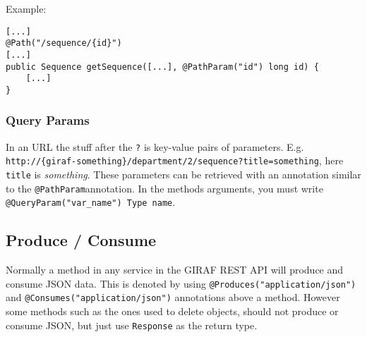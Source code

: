 \bigskip\noindent
Example:
\begin{lstlisting}[style=Java]
[...]
@Path("/sequence/{id}")
[...]
public Sequence getSequence([...], @PathParam("id") long id) {
    [...]
}
\end{lstlisting}

\subsubsection{Query Params}
In an URL the stuff after the \texttt{?} is key-value pairs of parameters. E.g. \texttt{http://\{giraf-something\}/department/2/sequence?title=something}, here \texttt{title} is \textit{something}.
These parameters can be retrieved with an annotation similar to the \texttt{@PathParam}annotation.
In the methods arguments, you must write \texttt{@QueryParam("var\_name") Type name}.


\subsection{Produce / Consume}
Normally a method in any service in the GIRAF REST API will produce and consume JSON data. This is denoted by using \texttt{@Produces("application/json")} and \texttt{@Consumes("application/json")} annotations above a method.
However some methods such as the ones used to delete objects, should not produce or consume JSON, but just use \texttt{Response} as the return type.
